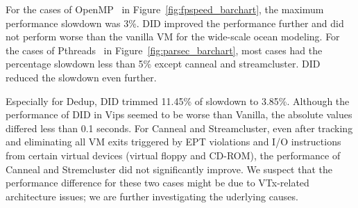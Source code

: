 For the cases of OpenMP~\cite{dagum:1998} in
Figure~\ref{fig:fpspeed_barchart}, the maximum performance
slowdown was 3\%. DID improved the performance further and did
not perform worse than the vanilla VM for the wide-scale ocean
modeling. For the cases of Pthreads~\cite{lewis:1998} in
Figure~\ref{fig:parsec_barchart}, most cases had the
percentage slowdown less than 5\% except canneal and
streamcluster. DID reduced the slowdown even further.

Especially for Dedup, DID trimmed 11.45\% of slowdown to
3.85\%. Although the performance of DID in Vips seemed to be
worse than Vanilla, the absolute values
differed less than 0.1 seconds.
For Canneal and Streamcluster,
even after tracking and eliminating all VM exits triggered by EPT violations
and I/O instructions from certain virtual devices
(virtual floppy and CD-ROM), the performance of 
Canneal and Stremcluster did not significantly improve.
We suspect that the performance difference for these two cases 
might be due to VTx-related architecture issues; we are
further investigating the uderlying causes.

